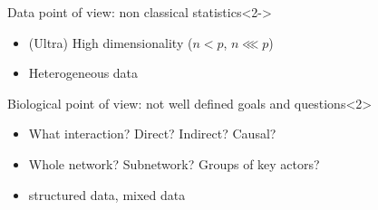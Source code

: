 \begin{frame}
  \vspace{-.25cm}
  \begin{block}{Data point of view: \alert{non classical statistics}}<2->
    \vspace{-.25cm}
    \begin{footnotesize}
    \begin{itemize}
    \item (Ultra) High dimensionality ($n<p$, $n\lll p$)
    \item Heterogeneous data
    \end{itemize}
      \end{footnotesize}    
  \end{block}
  \vspace{-.35cm}
  \begin{block}{Biological point of view: \alert{not well defined goals and questions}}<2>
    \vspace{-.25cm}    
    \begin{footnotesize}
    \begin{itemize}
    \item What interaction? Direct? Indirect? Causal?
    \item Whole network? Subnetwork? Groups of key actors?
    \item structured data, mixed data
    \end{itemize}
      \end{footnotesize}    
  \end{block}

\end{frame}

  


